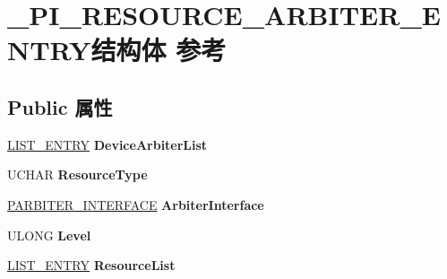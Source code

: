 \hypertarget{struct___p_i___r_e_s_o_u_r_c_e___a_r_b_i_t_e_r___e_n_t_r_y}{}\section{\+\_\+\+P\+I\+\_\+\+R\+E\+S\+O\+U\+R\+C\+E\+\_\+\+A\+R\+B\+I\+T\+E\+R\+\_\+\+E\+N\+T\+R\+Y结构体 参考}
\label{struct___p_i___r_e_s_o_u_r_c_e___a_r_b_i_t_e_r___e_n_t_r_y}
\subsection*{Public 属性}
\begin{DoxyCompactItemize}
\item 
\mbox{\label{struct___p_i___r_e_s_o_u_r_c_e___a_r_b_i_t_e_r___e_n_t_r_y_aeb07797ddb7d078010dff3a530c148cb}} 
\hyperlink{struct___l_i_s_t___e_n_t_r_y}{L\+I\+S\+T\+\_\+\+E\+N\+T\+RY} {\bfseries Device\+Arbiter\+List}
\item 
\mbox{\label{struct___p_i___r_e_s_o_u_r_c_e___a_r_b_i_t_e_r___e_n_t_r_y_aeb1db25dbfceed0ae6910953def7d1bc}} 
U\+C\+H\+AR {\bfseries Resource\+Type}
\item 
\mbox{\label{struct___p_i___r_e_s_o_u_r_c_e___a_r_b_i_t_e_r___e_n_t_r_y_a16343f6aca5490c5bb0fe13a129d76a6}} 
\hyperlink{struct___a_r_b_i_t_e_r___i_n_t_e_r_f_a_c_e}{P\+A\+R\+B\+I\+T\+E\+R\+\_\+\+I\+N\+T\+E\+R\+F\+A\+CE} {\bfseries Arbiter\+Interface}
\item 
\mbox{\label{struct___p_i___r_e_s_o_u_r_c_e___a_r_b_i_t_e_r___e_n_t_r_y_ae5c7991be9001cc23ac65241fc6e5fc3}} 
U\+L\+O\+NG {\bfseries Level}
\item 
\mbox{\label{struct___p_i___r_e_s_o_u_r_c_e___a_r_b_i_t_e_r___e_n_t_r_y_ad48b51a9ae4dd3d4a5cda5791510502b}} 
\hyperlink{struct___l_i_s_t___e_n_t_r_y}{L\+I\+S\+T\+\_\+\+E\+N\+T\+RY} {\bfseries Resource\+List}
\item 

\end{DoxyCompactItemize}
